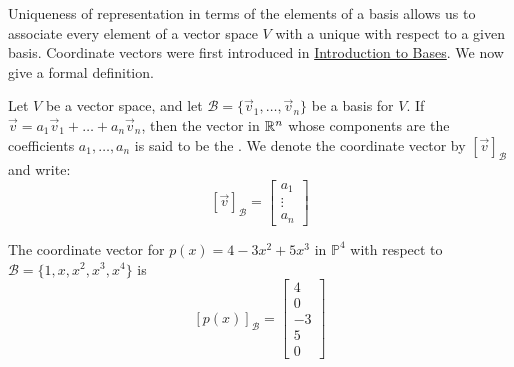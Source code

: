 \documentclass{ximera}
\begin{document}
Uniqueness of representation in terms of the elements of a basis allows us to associate every element of a vector space $V$ with a unique  with respect to a given basis.  Coordinate vectors were first introduced in \href{https://ximera.osu.edu/oerlinalg/LinearAlgebra/VSP-0030/main}{Introduction to Bases}.  We now give a formal definition.

\begin{definition}\label{def:coordvector}
Let $V$ be a vector space, and let $\mathcal{B}=\{\vec{v}_1, \ldots ,\vec{v}_n\}$ be a basis for $V$.  If $\vec{v}=a_1\vec{v}_1+\ldots +a_n\vec{v}_n$, then the vector in $\mathbb{R}^n$ whose components are the coefficients $a_1, \ldots ,a_n$  is said to be the .  We denote the coordinate vector by $[\vec{v}]_{\mathcal{B}}$ and write:
$$[\vec{v}]_{\mathcal{B}}=\begin{bmatrix}a_1\\\vdots \\a_n\end{bmatrix}$$
\end{definition}

\begin{example}\label{ex:coordvectorinpolyvectspace}
The coordinate vector for $p(x)=4-3x^2+5x^3$ in $\mathbb{P}^4$ with respect to $\mathcal{B}=\{1, x, x^2, x^3, x^4\}$ is 
$$[p(x)]_{\mathcal{B}}=\begin{bmatrix}4\\0\\-3\\5\\0\end{bmatrix}$$
\end{example}
\end{document}
